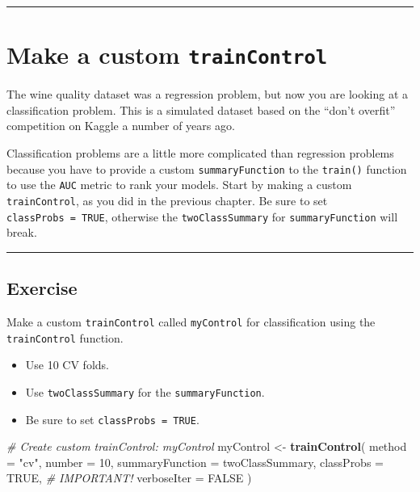 \documentclass[
]{book}
\newenvironment{Shaded}{\begin{snugshade}}{\end{snugshade}}
\newcommand{\CommentTok}[1]{\textcolor[rgb]{0.56,0.35,0.01}{\textit{#1}}}
\newcommand{\DataTypeTok}[1]{\textcolor[rgb]{0.13,0.29,0.53}{#1}}
\newcommand{\DecValTok}[1]{\textcolor[rgb]{0.00,0.00,0.81}{#1}}
\newcommand{\KeywordTok}[1]{\textcolor[rgb]{0.13,0.29,0.53}{\textbf{#1}}}
\newcommand{\NormalTok}[1]{#1}
\newcommand{\OtherTok}[1]{\textcolor[rgb]{0.56,0.35,0.01}{#1}}
\newcommand{\StringTok}[1]{\textcolor[rgb]{0.31,0.60,0.02}{#1}}
\begin{document}
\begin{center}\rule{0.5\linewidth}{0.5pt}\end{center}

\hypertarget{make-a-custom-traincontrol}{%
\section{\texorpdfstring{Make a custom \texttt{trainControl}}{Make a custom trainControl}}\label{make-a-custom-traincontrol}}

The wine quality dataset was a regression problem, but now you are looking at a classification problem. This is a simulated dataset based on the ``don't overfit'' competition on Kaggle a number of years ago.

Classification problems are a little more complicated than regression problems because you have to provide a custom \texttt{summaryFunction} to the \texttt{train()} function to use the \texttt{AUC} metric to rank your models. Start by making a custom \texttt{trainControl}, as you did in the previous chapter. Be sure to set \texttt{classProbs\ =\ TRUE}, otherwise the \texttt{twoClassSummary} for \texttt{summaryFunction} will break.

\begin{center}\rule{0.5\linewidth}{0.5pt}\end{center}

\hypertarget{exercise-20}{%
\subsection*{Exercise}\label{exercise-20}}

Make a custom \texttt{trainControl} called \texttt{myControl} for classification using the \texttt{trainControl} function.

\begin{itemize}
\item
  Use 10 CV folds.
\item
  Use \texttt{twoClassSummary} for the \texttt{summaryFunction}.
\item
  Be sure to set \texttt{classProbs\ =\ TRUE}.
\end{itemize}

\begin{Shaded}
\begin{Highlighting}[]
\CommentTok{# Create custom trainControl: myControl}
\NormalTok{myControl <-}\StringTok{ }\KeywordTok{trainControl}\NormalTok{(}
  \DataTypeTok{method =} \StringTok{"cv"}\NormalTok{, }
  \DataTypeTok{number =} \DecValTok{10}\NormalTok{,}
  \DataTypeTok{summaryFunction =}\NormalTok{ twoClassSummary,}
  \DataTypeTok{classProbs =} \OtherTok{TRUE}\NormalTok{, }\CommentTok{# IMPORTANT!}
  \DataTypeTok{verboseIter =} \OtherTok{FALSE}
\NormalTok{)}
\end{Highlighting}
\end{Shaded}
\end{document}
